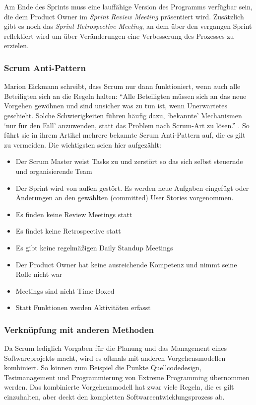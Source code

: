 Am Ende des Sprints muss eine lauffähige Version des Programms verfügbar sein, die dem Product Owner im \emph{Sprint Review Meeting} präsentiert wird. Zusätzlich gibt es noch das \emph{Sprint Retrospective Meeting}, an dem über den vergangen Sprint reflektiert wird um über Veränderungen eine Verbesserung des Prozesses zu erzielen.

\subsubsection{Scrum Anti-Pattern}
Marion Eickmann schreibt, dass Scrum nur dann funktioniert, wenn auch alle Beteiligten sich an die Regeln halten: ``Alle Beteiligten müssen sich an das neue Vorgehen gewöhnen und sind unsicher was zu tun ist, wenn Unerwartetes geschieht. Solche Schwierigkeiten führen häufig dazu, `bekannte' Mechanismen `nur für den Fall' anzuwenden, statt das Problem nach Scrum-Art zu lösen.'' \cite[S. 84]{bib:ix2010}. So führt sie in ihrem Artikel mehrere bekannte Scrum Anti-Pattern auf, die es gilt zu vermeiden. Die wichtigsten seien hier aufgezählt:
\begin{itemize}
  \item Der Scrum Master weist Tasks zu und zerstört so das sich selbst steuernde und organisierende Team
  \item Der Sprint wird von außen gestört. Es werden neue Aufgaben eingefügt oder Änderungen an den gewählten (committed) User Stories vorgenommen.
  \item Es finden keine Review Meetings statt
  \item Es findet keine Retrospective statt
  \item Es gibt keine regelmäßigen Daily Standup Meetings
  \item Der Product Owner hat keine ausreichende Kompetenz und nimmt seine Rolle nicht war
  \item Meetings sind nicht Time-Boxed
  \item Statt Funktionen werden Aktivitäten erfasst
\end{itemize} 

\subsubsection{Verknüpfung mit anderen Methoden}
Da Scrum lediglich Vorgaben für die Planung und das Management eines Softwareprojekts macht, wird es oftmals mit anderen Vorgehensmodellen kombiniert. So können zum Beispiel die Punkte Quellcodedesign, Testmanagement und Programmierung von Extreme Programming übernommen werden. Das kombinierte Vorgehensmodell hat zwar viele Regeln, die es gilt einzuhalten, aber deckt den kompletten Softwareentwicklungsprozess ab.

